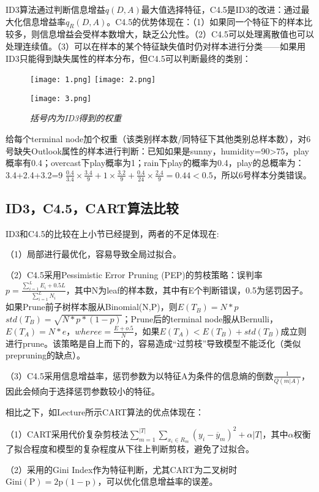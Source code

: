 \documentclass[cn]{elegantpaper}
\begin{document}
ID3算法通过判断信息增益$q(D,A)$最大值选择特征，C4.5是ID3的改进：通过最大化信息增益率$q_{R}(D,A)$。C4.5的优势体现在：（1）如果同一个特征下的样本比较多，则信息增益会受样本数增大，缺乏公允性。（2）C4.5可以处理离散值也可以处理连续值。（3）可以在样本的某个特征缺失值时仍对样本进行分类——如果用ID3只能得到缺失属性的样本分布，但C4.5可以判断最终的类别：
\begin{figure}[H]
	\centering
	\texttt{[image: 1.png]}
	 \bigbreak
	\texttt{[image: 2.png]}
	\caption{ \emph{括号内为ID3得到的权重}}
	\bigbreak
	\texttt{[image: 3.png]}
\end{figure}
给每个terminal node加个权重（该类别样本数/同特征下其他类别总样本数），对6号缺失Outlook属性的样本进行判断：已知如果是sunny，humidity=90>75，play概率有0.4；overcast下play概率为1；rain下play的概率为0.4，play的总概率为：3.4+2.4+3.2=9 \quad $\frac{0.4}{3.4} \times \frac{3.4}{9}+1 \times \frac{3.2}{9}+\frac{0.4}{24} \times \frac{2.4}{9}=0.44<0.5$，所以6号样本分类错误。

\subsection{ID3，C4.5，CART算法比较}
ID3和C4.5的比较在上小节已经提到，两者的不足体现在:

\noindent（1）局部进行最优化，容易导致全局过拟合。

\noindent（2）C4.5采用Pessimistic Error Pruning (PEP)的剪枝策略：误判率$p=\frac{\sum_{i=1}^{L} E_{i}+0.5 L}{\sum_{i=1}^{L} N_{i}}$，其中N为leaf的样本数，其中有E个判断错误，0.5为惩罚因子。如果Prune前子树样本服从Binomial(N,P)，则$E(T_{B})=N * p$\quad$std(T_{B})=\sqrt{N * p *(1-p)}$；Prune后的terminal node服从Bernulli，$E(T_{A})=N *e，where e = \frac{E+o.5}{N}$，如果$E(T_{A})<E(T_{B})+std(T_{B})$成立则进行prune。该策略是自上而下的，容易造成“过剪枝”导致模型不能泛化（类似prepruning的缺点）。

\noindent（3）C4.5采用信息增益率，惩罚参数为以特征A为条件的信息熵的倒数$\frac{1}{Q(m|A)}$，因此会倾向于选择惩罚参数较小的特征。
\bigbreak

相比之下，如Lecture所示CART算法的优点体现在：

\noindent（1）CART采用代价复杂剪枝法$\sum_{m=1}^{|T|} \sum_{x_{i} \in R_{m}}\left(y_{i}-\overline{y}_{m}\right)^{2}+\alpha|T|$，其中$\alpha$权衡了拟合程度和模型的复杂程度从下往上判断剪枝，避免了过拟合。

\noindent（2）采用的Gini Index作为特征判断，尤其CART为二叉树时 $\mathrm {Gini(P)}=2 \mathrm{p}(1-\mathrm{p})$，可以优化信息增益率的误差。
\end{document}
